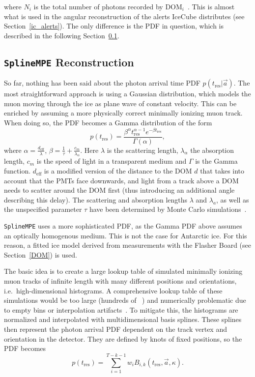 where $N_i$ is the total number of photons recorded by $\text{DOM}_i$~\cite{Ahrens2004}. This is almost what is used in the angular reconstruction of the alerts IceCube distributes (see Section~\ref{ic_alerts}). The only difference is the PDF in question, which is described in the following Section~\ref{spline_mpe}.

\subsection{\texttt{SplineMPE} Reconstruction}\label{spline_mpe}
So far, nothing has been said about the photon arrival time PDF $p(t_\text{res}|\vec{a})$. The most straightforward approach is using a Gaussian distribution, which models the muon moving through the ice as plane wave of constant velocity. This can be enriched by assuming a more physically correct minimally ionizing muon track. When doing so, the PDF becomes a Gamma distribution of the form
\begin{equation}
    p(t_\text{res}) = \frac{\beta^\alpha t_\text{res}^{\alpha-1} e^{-\beta t_\text{res}}}{\Gamma(\alpha)},
\end{equation}
where $\alpha=\frac{d_\text{eff}}{\lambda}$, $\beta=\frac{1}{\tau} + \frac{c_m}{\lambda_\alpha}$. Here $\lambda$ is the scattering length, $\lambda_\alpha$ the absorption length, $c_m$ is the speed of light in a transparent medium and $\Gamma$ is the Gamma function. $d_\text{eff}$ is a modified version of the distance to the DOM $d$ that takes into account that the PMTs face downwards, and light from a track above a DOM needs to scatter around the DOM first (thus introducing an additional angle describing this delay). The scattering and absorption lengths $\lambda$ and $\lambda_a$, as well as the unspecified parameter $\tau$ have been determined by Monte Carlo simulations~.

\texttt{SplineMPE} uses a more sophisticated PDF, as the Gamma PDF above assumes an optically homogenous medium. This is not the case for Antarctic ice. For this reason, a fitted ice model derived from measurements with the Flasher Board (see Section~\ref{DOM}) is used.

The basic idea is to create a large lookup table of simulated minimally ionizing muon tracks of infinite length with many different positions and orientations, i.e.\ high-dimensional histograms. A comprehensive lookup table of these simulations would be too large (hundreds of \unit{\giga\byte}) and numerically problematic due to empty bins or interpolation artifacts~. To mitigate this, the histograms are normalized and interpolated with multidimensional basis splines. These splines then represent the photon arrival PDF dependent on the track vertex and orientation in the detector. They are defined by knots of fixed positions, so the PDF becomes
\begin{equation}
    p(t_\text{res}) = \sum_{i=1}^{T-k-1} w_i B_{i,k}(t_\text{res},\vec{a}, \kappa).
\end{equation}

